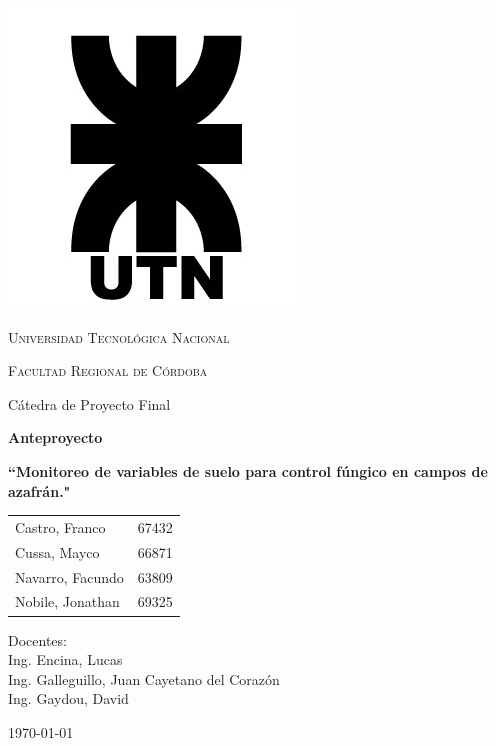\begin{titlepage}
 \centering
	\includegraphics[scale=0.80]{Imagenes/LOGO.jpg} \par
 	\vspace{1cm}
 	{\scshape\LARGE Universidad Tecnológica Nacional \par}
 	{\scshape\large Facultad Regional de Córdoba \par}
 	\vspace{1cm}
 	{\Large Cátedra de Proyecto Final \par}
	\vspace{0.5cm}
	{\bfseries \LARGE Anteproyecto \par}
	\vspace{0.5cm}
	 {\bfseries \Large ``Monitoreo de variables de suelo para control fúngico en campos de azafrán." \par}

 	\vspace{1.5cm}

	\begin{tabular}{ll}
	    Castro, Franco          &   67432 \\
	    Cussa, Mayco            &   66871 \\
		Navarro, Facundo 	    &	63809 \\
		Nobile, Jonathan        &   69325 
	\end{tabular}
	
	\vspace{1cm}
	
 	\vfill

	Docentes: \\
        Ing. Encina, Lucas \\ 
        Ing. Galleguillo, Juan Cayetano del Corazón \\
        Ing. Gaydou, David 

 	\vfill
	{\large \today\par}
\end{titlepage}
